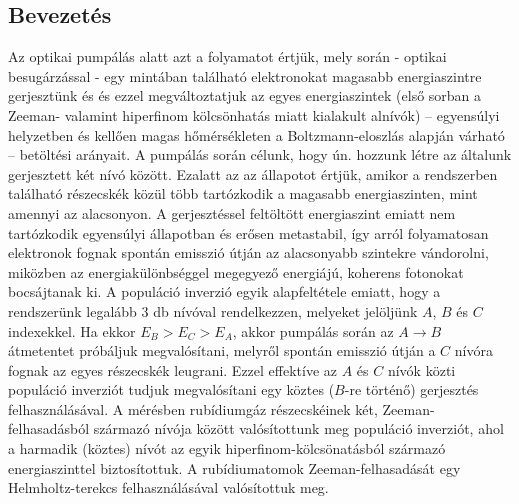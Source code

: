 \begin{multicols}{2}
\section{Bevezetés}
Az optikai pumpálás alatt azt a folyamatot értjük, mely során - optikai besugárzással - egy mintában található elektronokat magasabb energiaszintre gerjesztünk és és ezzel megváltoztatjuk az egyes energiaszintek (első sorban a Zeeman- valamint hiperfinom kölcsönhatás miatt kialakult alnívók) -- egyensúlyi helyzetben és kellően magas hőmérsékleten a Boltzmann-eloszlás alapján várható -- betöltési arányait. A pumpálás során célunk, hogy ún.  hozzunk létre az általunk gerjesztett két nívó között. Ezalatt az az állapotot értjük, amikor a rendszerben található részecskék közül több tartózkodik a magasabb energiaszinten, mint amennyi az alacsonyon. A gerjesztéssel feltöltött energiaszint emiatt nem tartózkodik egyensúlyi állapotban és erősen metastabil, így arról folyamatosan elektronok fognak spontán emisszió útján az alacsonyabb szintekre vándorolni, miközben az energiakülönbséggel megegyező energiájú, koherens fotonokat bocsájtanak ki. A populáció inverzió egyik alapfeltétele emiatt, hogy a rendszerünk legalább $3$ db nívóval rendelkezzen, melyeket jelöljünk $A$, $B$ és $C$ indexekkel. Ha ekkor $E_{B} > E_{C} > E_{A}$, akkor pumpálás során az $A \to B$ átmetentet próbáljuk megvalósítani, melyről spontán emisszió útján a $C$ nívóra fognak az egyes részecskék leugrani. Ezzel effektíve az $A$ és $C$ nívók közti populáció inverziót tudjuk megvalósítani egy köztes ($B$-re történő) gerjesztés felhasználásával. \newline
A mérésben rubídiumgáz részecskéinek két, Zeeman-felhasadásból származó nívója között valósítottunk meg populáció inverziót, ahol a harmadik (köztes) nívót az egyik hiperfinom-kölcsönatásból származó energiaszinttel biztosítottuk. A rubídiumatomok Zeeman-felhasadását egy Helmholtz-terekcs felhasználásával valósítottuk meg.



\end{multicols}
